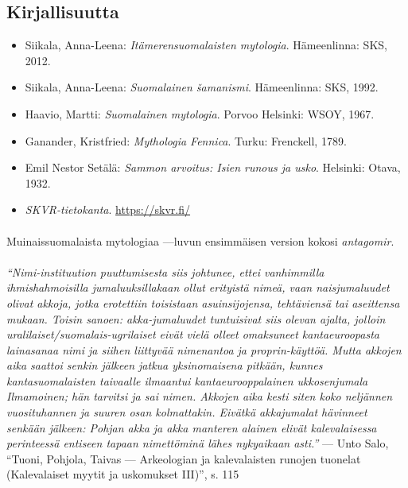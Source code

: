 \subsection{Kirjallisuutta}

  \begin{itemize}
    \item Siikala, Anna-Leena: \emph{Itämerensuomalaisten mytologia}. Hämeenlinna: SKS, 2012.
    \item Siikala, Anna-Leena: \emph{Suomalainen šamanismi}. Hämeenlinna: SKS, 1992.
    \item Haavio, Martti: \emph{Suomalainen mytologia}. Porvoo Helsinki: WSOY, 1967.
    \item Ganander, Kristfried: \emph{Mythologia Fennica}. Turku: Frenckell, 1789.
    \item Emil Nestor Setälä: \emph{Sammon arvoitus: Isien runous ja usko}. Helsinki: Otava, 1932.
    \item \emph{SKVR-tietokanta}. \url{https://skvr.fi/}
  \end{itemize}

  \paragraph{}
    {\small
      Muinaissuomalaista mytologiaa ---luvun ensimmäisen version kokosi \emph{antagomir}.
    }

  \paragraph{}
    {\small
      \emph{``Nimi-instituution puuttumisesta siis johtunee, ettei vanhimmilla ihmishahmoisilla
      jumaluuksillakaan ollut erityistä nimeä, vaan naisjumaluudet olivat akkoja, jotka erotettiin
      toisistaan asuinsijojensa, tehtäviensä tai aseittensa mukaan. Toisin sanoen: akka-jumaluudet
      tuntuisivat siis olevan ajalta, jolloin uralilaiset/suomalais-ugrilaiset eivät vielä olleet
      omaksuneet kantaeuroopasta lainasanaa nimi ja siihen liittyvää nimenantoa ja proprin-käyttöä.
      Mutta akkojen aika saattoi senkin jälkeen jatkua yksinomaisena pitkään, kunnes
      kantasuomalaisten taivaalle ilmaantui kantaeurooppalainen ukkosenjumala Ilmamoinen; hän
      tarvitsi ja sai nimen. Akkojen aika kesti siten koko neljännen vuosituhannen ja suuren osan
      kolmattakin. Eivätkä akkajumalat hävinneet senkään jälkeen: Pohjan akka ja akka manteren
      alainen elivät kalevalaisessa perinteessä entiseen tapaan nimettöminä lähes nykyaikaan
      asti.''} --- Unto Salo, ``Tuoni, Pohjola, Taivas --- Arkeologian ja kalevalaisten runojen
      tuonelat (Kalevalaiset myytit ja uskomukset III)'', s. 115
    }

